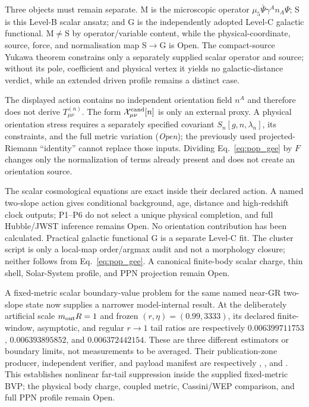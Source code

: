 \documentclass[11pt,a4paper]{article}
\begin{document}
Three objects must remain separate. M is the microscopic operator $\mu_5\bar\Psi\gamma^A n_A\Psi$; S is this Level-B scalar ansatz; and G is the independently adopted Level-C galactic functional. M$\neq$S by operator/variable content, while the physical-coordinate, source, force, and normalisation map S$\to$G is Open.  The compact-source Yukawa theorem constrains only a separately supplied scalar operator and source; without its pole, coefficient and physical vertex it yields no galactic-distance verdict, while an extended driven profile remains a distinct case.

The displayed action contains no independent orientation field $n^A$ and therefore does not derive $T^{(n)}_{\mu\nu}$.  The form $\mathcal X^{\rm cand}_{\mu\nu}[n]$ is only an external proxy.  A physical orientation stress requires a separately specified covariant $S_n[g,n,\lambda_n]$, its constraints, and the full metric variation (\emph{Open}); the previously used projected-Riemann ``identity'' cannot replace those inputs.  Dividing Eq.~\eqref{eq:pop_gee} by $F$ changes only the normalization of terms already present and does not create an orientation source.

The scalar cosmological equations are exact inside their declared action. A named two-slope action gives conditional background, age, distance and high-redshift clock outputs; P1--P6 do not select a unique physical completion, and full Hubble/JWST inference remains Open. No orientation contribution has been calculated.  Practical galactic functional G is a separate Level-C fit.  The cluster script is only a local-map order/argmax audit and not a morphology closure; neither follows from Eq.~\eqref{eq:pop_gee}.  A canonical finite-body scalar charge, thin shell, Solar-System profile, and PPN projection remain Open.

A fixed-metric scalar boundary-value problem for the same named near-GR
two-slope state now supplies a narrower model-internal result.  At the
deliberately artificial scale $m_{\rm out}R=1$ and frozen
$(r,\eta)=(0.99,3333)$, its declared finite-window, asymptotic, and regular
$r\to1$ tail ratios are respectively
$0.006399711753$, $0.006393895852$, and $0.006372442154$.  These are three
different estimators or boundary limits, not measurements to be averaged.
Their publication-zone producer, independent verifier, and payload manifest
are respectively
,
,
and .  This establishes
nonlinear far-tail suppression inside the supplied fixed-metric BVP; the
physical body charge, coupled metric, Cassini/WEP comparison, and full PPN
profile remain Open.
\end{document}
